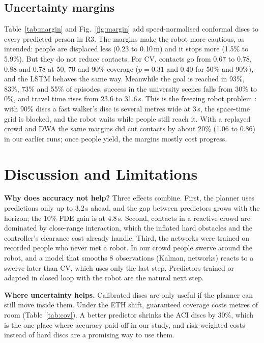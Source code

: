 \subsection{Uncertainty margins}
Table~\ref{tab:margin} and Fig.~\ref{fig:margin} add speed-normalised
conformal discs to every predicted person in R3. The margins make the robot
more cautious, as intended: people are displaced less (0.23 to
0.10\,m) and it stops more (1.5\% to 5.9\%). But they do not reduce
contacts. For CV, contacts go from 0.67 to 0.78, 0.88 and 0.78 at 50, 70
and 90\% coverage ($p=0.31$ and $0.40$ for 50\% and 90\%), and the LSTM
behaves the same way. Meanwhile the goal is reached in 93\%, 83\%, 73\%
and 55\% of episodes, success in the university scenes falls from 30\%
to 0\%, and travel time rises from 23.6 to 31.6\,s. This is the freezing
robot problem \cite{trautman2010}: with 90\% discs a fast walker's disc
is several metres wide at 3\,s, the space-time grid is blocked, and the
robot waits while people still reach it. With a replayed crowd and DWA
the same margins did cut contacts by about 20\% (1.06 to 0.86) in our
earlier runs; once people yield, the margins mostly cost progress.

\section{Discussion and Limitations}
\textbf{Why does accuracy not help?} Three effects combine. First, the
planner uses predictions only up to 3.2\,s ahead, and the gap between
predictors grows with the horizon; the 10\% FDE gain is at 4.8\,s.
Second, contacts in a reactive crowd are dominated by close-range
interaction, which the inflated hard obstacles and the controller's
clearance cost already handle. Third, the networks were trained on
recorded people who never met a robot. In our crowd people swerve
around the robot, and a model that smooths 8 observations (Kalman,
networks) reacts to a swerve later than CV, which uses only the last
step. Predictors trained or adapted in closed loop with the robot are the
natural next step.

\textbf{Where uncertainty helps.} Calibrated discs are only useful if the
planner can still move inside them. Under the ETH shift, guaranteed
coverage costs metres of room (Table~\ref{tab:cov}). A better predictor
shrinks the ACI discs by 30\%, which is the one place where accuracy paid
off in our study, and risk-weighted costs instead of hard discs
\cite{lindemann2023,dixit2023} are a promising way to use them.

